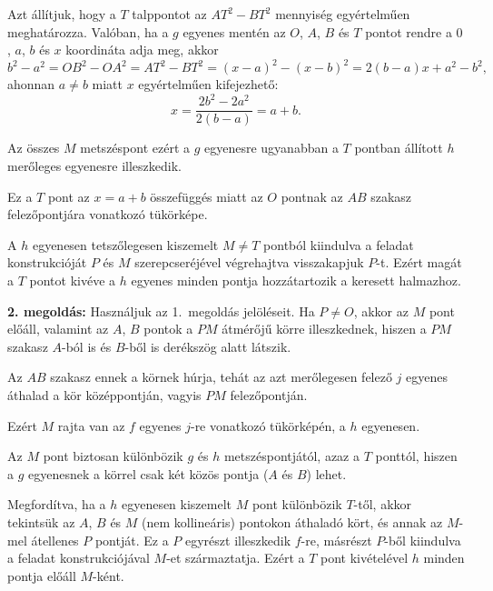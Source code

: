 \documentclass[a4paper,10pt]{article}
\begin{document}
\smallskip
\noindent Azt állítjuk, hogy a $T$ talppontot az $AT^2-BT^2$ mennyiség egyértelműen meghatározza. Valóban, ha a $g$ egyenes mentén az $O$, $A$, $B$ és $T$ pontot rendre a $0$, $a$, $b$ és $x$ koordináta adja meg, akkor 
\[b^2-a^2=OB^2-OA^2=AT^2-BT^2=(x-a)^2-(x-b)^2=2(b-a)x+a^2-b^2,\]%
ahonnan $a\ne b$ miatt $x$ egyértelműen kifejezhető: 
\[x=\frac{2b^2-2a^2}{2(b-a)}=a+b.\]%

\smallskip

\noindent Az összes $M$ metszéspont ezért a $g$ egyenesre ugyanabban a $T$ pontban állított $h$ merőleges egyenesre illeszkedik. 

\smallskip

\noindent Ez a $T$ pont az $x=a+b$ összefüggés miatt az $O$ pontnak az $AB$ szakasz felezőpontjára vonatkozó tükörképe. 

\smallskip

\noindent A $h$ egyenesen tetszőlegesen kiszemelt $M\ne T$ pontból kiindulva a feladat konstrukcióját $P$ és $M$ szerepcseréjével végrehajtva visszakapjuk $P$-t. Ezért magát a $T$ pontot kivéve a $h$ egyenes minden pontja hozzátartozik a keresett halmazhoz.

\medskip

{\bf 2. megoldás: } Használjuk az 1.~megoldás jelöléseit. Ha $P\ne O$, akkor az $M$ pont előáll,
valamint az $A$, $B$ pontok a $PM$ átmérőjű körre illeszkednek, hiszen a $PM$ szakasz $A$-ból is és $B$-ből is derékszög alatt látszik. 

\smallskip

\noindent Az $AB$ szakasz ennek a körnek húrja, tehát az azt merőlegesen felező $j$ egyenes áthalad a kör középpontján, vagyis $PM$ felezőpontján. 

\smallskip

\noindent Ezért $M$ rajta van az $f$ egyenes $j$-re vonatkozó tükörképén, a $h$ egyenesen. 

\smallskip

\noindent Az $M$ pont biztosan különbözik $g$ és $h$ metszéspontjától, azaz a $T$ ponttól, hiszen a $g$ egyenesnek a körrel csak két közös pontja ($A$ és $B$) lehet. 

\smallskip

\noindent Megfordítva, ha a $h$ egyenesen kiszemelt $M$ pont különbözik $T$-től, akkor tekintsük az $A$, $B$ és $M$ (nem kollineáris) pontokon áthaladó kört, és annak az $M$-mel átellenes $P$ pontját. Ez a $P$ egyrészt illeszkedik $f$-re, másrészt $P$-ből kiindulva a feladat konstrukciójával $M$-et származtatja. Ezért a $T$ pont kivételével $h$ minden pontja előáll $M$-ként.
\end{document}
